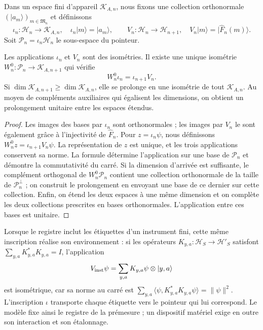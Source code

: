 Dans un espace fini d'appareil \(\mathcal K_{A,n}\), nous fixons une collection orthonormale \((|a_m\rangle)_{m\in\mathfrak M_n}\) et définissons
\[
 \iota_n:\mathcal H_n\longrightarrow\mathcal K_{A,n},
 \quad \iota_n|m\rangle=|a_m\rangle,
 \qquad
 V_n:\mathcal H_n\longrightarrow\mathcal H_{n+1},
 \quad V_n|m\rangle=|\widehat F_n(m)\rangle.
\]
Soit \(\mathcal P_n=\iota_n\mathcal H_n\) le sous-espace du pointeur.

\begin{theorem}
\label{vii:thm:observador-entrelazador}
Les applications \(\iota_n\) et \(V_n\) sont des isométries. Il existe une unique
isométrie \(W_n^0:\mathcal P_n\longrightarrow\mathcal K_{A,n+1}\)
qui vérifie
\begin{equation}
 W_n^0\iota_n=\iota_{n+1}V_n.
 \label{vii:eq:observador-cuadrado}
\end{equation}
Si \(\dim\mathcal K_{A,n+1}\geq\dim\mathcal K_{A,n}\),
elle se prolonge en une isométrie de tout \(\mathcal K_{A,n}\).
Au moyen de compléments auxiliaires qui égalisent les dimensions, on obtient
un prolongement unitaire entre les espaces étendus.
\end{theorem}

\begin{proof}
Les images des bases par \(\iota_n\) sont orthonormales ; les images par \(V_n\) le sont également grâce à l'injectivité de \(\widehat F_n\). Pour \(z=\iota_n\psi\), nous définissons \(W_n^0z=\iota_{n+1}V_n\psi\). La représentation de \(z\) est unique, et les trois applications conservent sa norme. La formule détermine l'application sur une base de \(\mathcal P_n\) et démontre la commutativité du carré. Si la dimension d'arrivée est suffisante, le complément orthogonal de \(W_n^0\mathcal P_n\) contient une collection orthonormale de la taille de \(\mathcal P_n^\perp\) ; on construit le prolongement en envoyant une base de ce dernier sur cette collection. Enfin, on étend les deux espaces à une même dimension et on complète les deux collections prescrites en bases orthonormales. L'application entre ces bases est unitaire.
\end{proof}

Lorsque le registre inclut les étiquettes d'un instrument fini, cette même inscription réalise son environnement : si les opérateurs \(K_{y,a}:\mathcal H_S\to\mathcal H'_S\) satisfont \(\sum_{y,a}K_{y,a}^*K_{y,a}=I\), l'application
\[
 V_{\rm inst}\psi=\sum_{y,a}K_{y,a}\psi\otimes|y,a\rangle
\]
est isométrique, car sa norme au carré est
\(\sum_{y,a}\langle\psi,K_{y,a}^*K_{y,a}\psi\rangle=\|\psi\|^2\).
L'inscription \(\iota\) transporte chaque étiquette vers le pointeur qui lui
correspond. Le modèle fixe ainsi le registre de la prémesure ; un
dispositif matériel exige en outre son interaction et son étalonnage.

